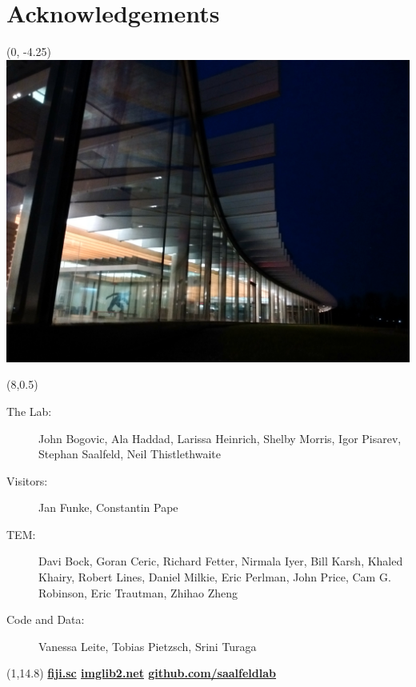 \documentclass[aspectratio=169,table]{beamer}
\begin{document}
\section{Acknowledgements}
\begin{frame}
    \begin{textblock}{16}(0, -4.25) 
        \includegraphics[width=\textwidth]{fig/janelia.jpg}
    \end{textblock}%
    \begin{textblock}{7.8}(8,0.5)
        \scriptsize%
        \begin{description}
              \item[The Lab:]{John Bogovic, Ala Haddad, Larissa Heinrich, Shelby Morris, Igor Pisarev, Stephan Saalfeld, Neil Thistlethwaite}
              \item[Visitors:]{Jan Funke, Constantin Pape}
              \item[TEM:]{Davi Bock, Goran Ceric, Richard Fetter, Nirmala Iyer, Bill Karsh, Khaled Khairy, Robert Lines, Daniel Milkie, Eric Perlman, John Price, Cam G. Robinson, Eric Trautman, Zhihao Zheng}
              \item[Code and Data:]{Vanessa Leite, Tobias Pietzsch, Srini Turaga}
        \end{description}
    \end{textblock}

    \begin{textblock}{14}(1,14.8)
        \large\bf
        \href{http://fiji.sc}{fiji.sc} \hspace{2cm} \href{http://imglib2.net}{imglib2.net} \hspace{2cm} \href{https://github.com/saalfeldlab}{github.com/saalfeldlab}
    \end{textblock}



\end{frame}
\end{document}
